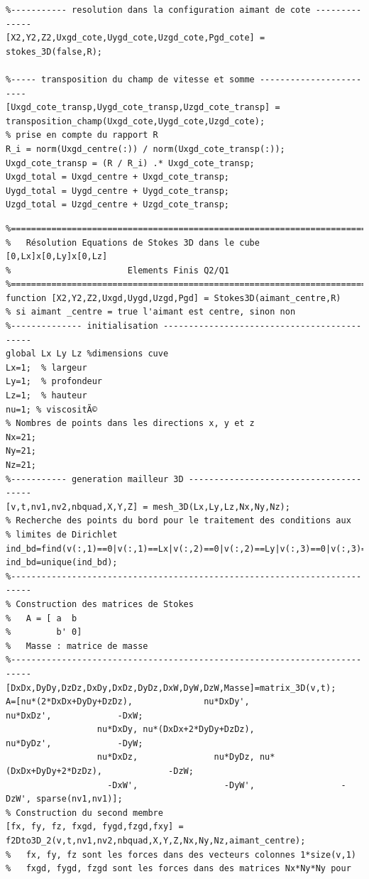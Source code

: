 \documentclass[a4paper,12pt,titlepage]{report}
\begin{document}
\begin{onehalfspace}
\begin{appendix}
\begin{verbatim}
%----------- resolution dans la configuration aimant de cote --------------
[X2,Y2,Z2,Uxgd_cote,Uygd_cote,Uzgd_cote,Pgd_cote] = stokes_3D(false,R);

%----- transposition du champ de vitesse et somme ------------------------
[Uxgd_cote_transp,Uygd_cote_transp,Uzgd_cote_transp] = transposition_champ(Uxgd_cote,Uygd_cote,Uzgd_cote);
% prise en compte du rapport R
R_i = norm(Uxgd_centre(:)) / norm(Uxgd_cote_transp(:));
Uxgd_cote_transp = (R / R_i) .* Uxgd_cote_transp;
Uxgd_total = Uxgd_centre + Uxgd_cote_transp;
Uygd_total = Uygd_centre + Uygd_cote_transp;
Uzgd_total = Uzgd_centre + Uzgd_cote_transp;
\end{verbatim}
\begin{verbatim}
%=========================================================================%
% 	Résolution Equations de Stokes 3D dans le cube [0,Lx]x[0,Ly]x[0,Lz]
% 						Elements Finis Q2/Q1
%=========================================================================%
function [X2,Y2,Z2,Uxgd,Uygd,Uzgd,Pgd] = Stokes3D(aimant_centre,R)
% si aimant _centre = true l'aimant est centre, sinon non
%-------------- initialisation --------------------------------------------
global Lx Ly Lz %dimensions cuve
Lx=1;  % largeur
Ly=1;  % profondeur
Lz=1;  % hauteur
nu=1; % viscositÃ©
% Nombres de points dans les directions x, y et z
Nx=21;
Ny=21;
Nz=21;
%----------- generation mailleur 3D ---------------------------------------
[v,t,nv1,nv2,nbquad,X,Y,Z] = mesh_3D(Lx,Ly,Lz,Nx,Ny,Nz);
% Recherche des points du bord pour le traitement des conditions aux 
% limites de Dirichlet
ind_bd=find(v(:,1)==0|v(:,1)==Lx|v(:,2)==0|v(:,2)==Ly|v(:,3)==0|v(:,3)==Lz);
ind_bd=unique(ind_bd);
%--------------------------------------------------------------------------
% Construction des matrices de Stokes 
%   A = [ a  b
%         b' 0]
%   Masse : matrice de masse
%--------------------------------------------------------------------------
[DxDx,DyDy,DzDz,DxDy,DxDz,DyDz,DxW,DyW,DzW,Masse]=matrix_3D(v,t);
A=[nu*(2*DxDx+DyDy+DzDz),              nu*DxDy',              nu*DxDz',             -DxW;
                  nu*DxDy, nu*(DxDx+2*DyDy+DzDz),              nu*DyDz',             -DyW;
                  nu*DxDz,               nu*DyDz, nu*(DxDx+DyDy+2*DzDz),             -DzW;
                    -DxW',                 -DyW',                 -DzW', sparse(nv1,nv1)];
% Construction du second membre
[fx, fy, fz, fxgd, fygd,fzgd,fxy] = f2Dto3D_2(v,t,nv1,nv2,nbquad,X,Y,Z,Nx,Ny,Nz,aimant_centre); 
%   fx, fy, fz sont les forces dans des vecteurs colonnes 1*size(v,1)
%   fxgd, fygd, fzgd sont les forces dans des matrices Nx*Ny*Ny pour

\end{verbatim}
\end{appendix}
\end{onehalfspace}
\end{document}
